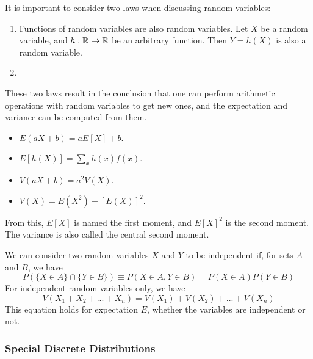 It is important to consider two laws when discussing random variables:
\begin{enumerate}
    \item Functions of random variables are also random variables. 
        Let \(X\) be a random variable, and \(h:\mathbb{R}\rightarrow\mathbb{R}\) be an arbitrary function.
        Then \(Y = h(X)\) is also a random variable.
    \item {}
\end{enumerate}
These two laws result in the conclusion that one can perform arithmetic operations with random variables to get new ones, and the expectation and variance can be computed from them.
\begin{itemize}
    \item \(E(aX + b) = aE[X] + b\).
    \item \(E[h(X)] = \sum_x h(x)f(x)\).
    \item \(V(aX + b) = a^2V(X)\).
    \item \(V(X) = E(X^2) - [E(X)]^2\).
\end{itemize}
From this, \(E[X]\) is named the first moment, and \(E[X]^2\) is the second moment. The variance is also called the central second moment.

We can consider two random variables \(X\) and \(Y\) to be independent if, for sets \(A\) and \(B\), we have
\begin{equation}
    P(\{X \in A\} \cap \{Y \in B\}) \equiv P(X \in A, Y \in B) = P(X \in A)P(Y \in B)
\end{equation}
For independent random variables only, we have
\begin{equation}
    V(X_1 + X_2 + ... + X_n) = V(X_1) + V(X_2) + ... + V(X_n)
\end{equation}
This equation holds for expectation \(E\), whether the variables are independent or not.

\subsubsection{Special Discrete Distributions}

